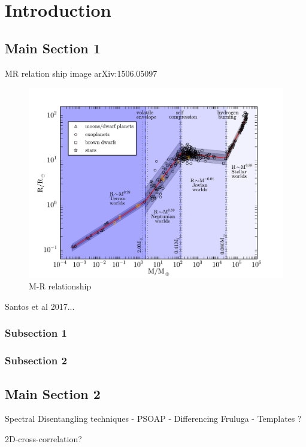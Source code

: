 \chapter{Introduction}  %
\label{cha:introduction} 


\section{Main Section 1}


MR relation ship image arXiv:1506.05097 \citet{chen_probabilistic_2016}

\begin{figure}
    \centering
    \includegraphics[width=0.7\linewidth]{./figures/introduction/plt_overlay_add.pdf}
    \caption{ M-R relationship \citet{chen_probabilistic_2016}}
    \label{fig:pltoverlayadd}
\end{figure}

Santos et al 2017...

\subsection{Subsection 1}



\subsection{Subsection 2}


\section{Main Section 2}


Spectral Disentangling techniques
- PSOAP
- Differencing Fruluga
- Templates ? 


2D-cross-correlation?

